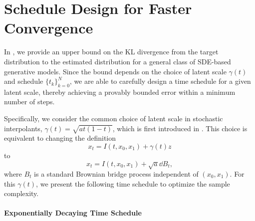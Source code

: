 \section{Schedule Design for Faster Convergence}
\label{sec:instance}



In , we provide an upper bound on the KL divergence from the target distribution to the estimated distribution for a general class of SDE-based generative models. Since the bound depends on the choice of latent scale $\gamma(t)$ and schedule $\{t_k\}_{k=0}^N$, we are able to carefully design a time schedule for a given latent scale, thereby achieving a provably bounded error within a minimum number of steps.

Specifically, we consider the common choice of latent scale in stochastic interpolants, $\gamma(t)=\sqrt{at(1-t)}$, which is first introduced in \citet{interpolation}. 
This choice is equivalent to changing the definition $$x_t=I(t,x_0,x_1)+\gamma(t)z$$
to $$x_t=I(t,x_0,x_1)+\sqrt{a}\dd B_t,$$
where $B_t$ is a standard Brownian bridge process independent of $(x_0,x_1)$. %
For this $\gamma(t)$, we present the following time schedule to optimize the sample complexity.

\paragraph{Exponentially Decaying Time Schedule} 

